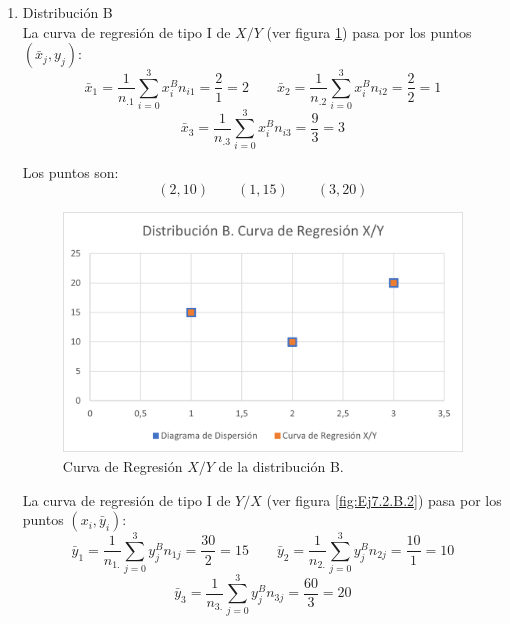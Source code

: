 \begin{ejercicio}
\begin{enumerate}
\begin{enumerate}
            \item Distribución B\\

            La curva de regresión de tipo I de $X/Y$ (ver figura \ref{fig:Ej7.2.B.1}) pasa por los puntos $(\bar{x}_j, y_j)$:
            \begin{equation*}
                \bar{x}_1 = \frac{1}{n_{.1}}\sum_{i=0}^3 x_i^B n_{i1} = \frac{2}{1} = 2
                \qquad
                \bar{x}_2 = \frac{1}{n_{.2}}\sum_{i=0}^3 x_i^B n_{i2} = \frac{2}{2} = 1
            \end{equation*}
            \begin{equation*}
                \bar{x}_3 = \frac{1}{n_{.3}}\sum_{i=0}^3 x_i^B n_{i3} = \frac{9}{3} = 3
            \end{equation*}

            Los puntos son:
            \begin{equation*}
                (2,10)\qquad (1,15) \qquad (3,20)
            \end{equation*}
            \begin{figure}[H]
                \centering
                \includegraphics[width=0.6\linewidth]{Imagenes/Ej7.2.B.1.png}
                \caption{Curva de Regresión $X/Y$ de la distribución B.}
                \label{fig:Ej7.2.B.1}
            \end{figure}
            

            La curva de regresión de tipo I de $Y/X$ (ver figura \ref{fig:Ej7.2.B.2}) pasa por los puntos $(x_i, \bar{y}_i)$:
            \begin{equation*}
                \bar{y}_1 = \frac{1}{n_{1.}}\sum_{j=0}^3 y_j^B n_{1j} = \frac{30}{2} = 15
                \qquad
                \bar{y}_2 = \frac{1}{n_{2.}}\sum_{j=0}^3 y_j^B n_{2j} = \frac{10}{1} = 10
            \end{equation*}
            \begin{equation*}
                \bar{y}_3 = \frac{1}{n_{3.}}\sum_{j=0}^3 y_j^B n_{3j} = \frac{60}{3} = 20
            \end{equation*}


\end{enumerate}
\end{enumerate}
\end{ejercicio}

